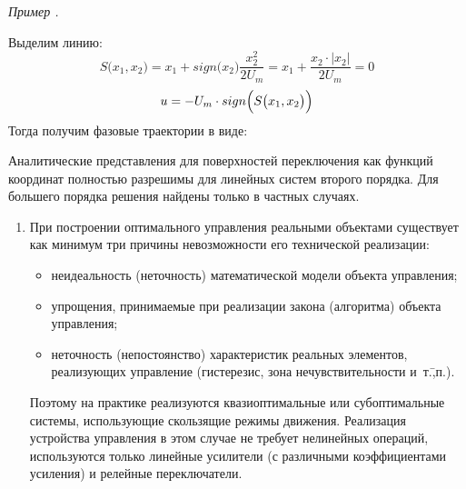 \documentclass[preprint,russian,a5paper,10pt,twoside,mediummath]{ncc}
\newcounter{problem}[section]				%
\renewcommand{\theproblem}{\thesection.\arabic{problem}}		%
\newenvironment{problem}%
	{\par \vspace{\baselineskip} \refstepcounter{problem} \begin{flushright} \textit{Пример \theproblem} \end{flushright} \vspace{-\baselineskip} \begin{oframed}}%
	{\par \end{oframed}}%
\begin{document}
\begin{problem}
Выделим линию:
\[ S \bigl( x_1, x_2 \bigr) = x_1 + sign \bigl( x_2 \bigr) \frac{x_2^2}{2U_m} = x_1 + \frac{x_2 \cdot \bigl| x_2 \bigr| }{2U_m} = 0 \]
\[ u = -U_m \cdot sign \Bigl( S \bigl( x_1, x_2 \bigr) \Bigr) \]
Тогда получим фазовые траектории в виде:
\begin{center}
\end{center}
\end{problem}
Аналитические представления для поверхностей переключения как функций координат полностью разрешимы для линейных систем второго порядка. Для большего порядка решения найдены только в частных случаях.

 \begin{enumerate}[resume]
 \item При построении оптимального управления реальными объектами существует как минимум три причины невозможности его технической реализации:
 \begin{itemize}
 \item неидеальность (неточность) математической модели объекта управления;
 \item упрощения, принимаемые при реализации закона (алгоритма) объекта управления;
 \item неточность (непостоянство) характеристик реальных элементов, реализующих управление (гистерезис, зона нечувствительности и~т.\=,п.).
  \end{itemize}

Поэтому на практике реализуются квазиоптимальные или субоптимальные системы, использующие скользящие режимы движения. Реализация устройства управления в этом случае не требует нелинейных операций, используются только линейные усилители (с различными коэффициентами усиления) и релейные переключатели.
 \end{enumerate}
 
\end{document}
